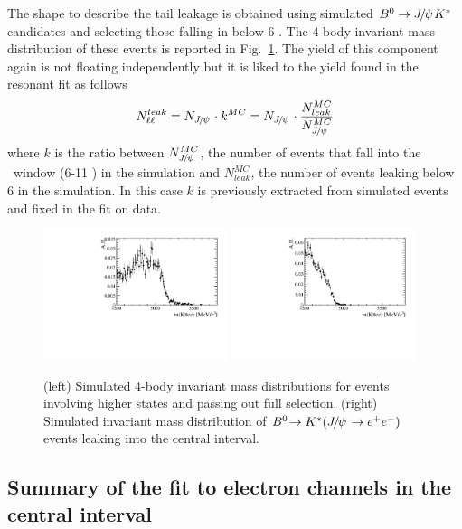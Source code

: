 The shape to describe the \jpsi tail leakage is obtained using simulated $\Bz\to\jpsi\Kstar$ candidates
and selecting those falling in \qsq below 6 \gevgevcccc. The 4-body invariant mass distribution
of these events is reported in Fig.~\ref{fig:RKst_rare_misreco_distrib}. The yield of this component
again is not floating independently but it is liked to the yield found in the resonant fit as follows
\begin{equation}
N_{\ell\ell}^{leak} = N_{\jpsi} \cdot k^{MC} = N_{\jpsi} \cdot \frac{N_{leak}^{MC}}{N_{\jpsi}^{MC}}
\end{equation}
where $k$ is the ratio between $N_{\jpsi}^{MC}$, the number of \jpsi events
that fall into the \jpsi ~\qsq window (6-11 \gevgevcccc) in the simulation
and $N_{leak}^{MC}$, the number of \jpsi events leaking below 6 \gevgevcccc in the simulation.
In this case $k$ is previously extracted from simulated events and fixed in the fit on data.

\begin{figure}[h!]
\centering
\includegraphics[width=0.48\textwidth]{RKst/figs/misreco/part_had.pdf}
\includegraphics[width=0.48\textwidth]{RKst/figs/misreco/jpsi_leakage.pdf}
\caption{(left) Simulated 4-body invariant mass distributions for events involving
higher \Kstar states and passing out full selection. (right) Simulated invariant mass
distribution of $\decay{\Bz}{\Kstar(\jpsi\to\ee)}$ events leaking into the central \qsq interval.}
\label{fig:RKst_rare_misreco_distrib}
\end{figure}


\subsection{Summary of the fit to electron channels in the central \qsq interval}

